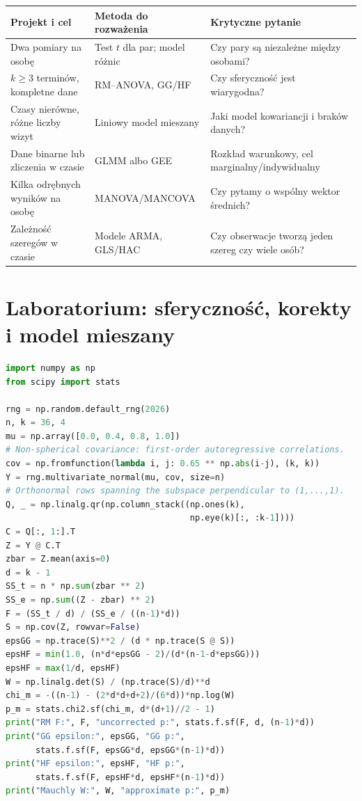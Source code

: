 \begin{center}\small
\begin{tabular}{>{\raggedright\arraybackslash}p{}>{\raggedright\arraybackslash}p{}>{\raggedright\arraybackslash}p{}}
\toprule
\textbf{Projekt i cel} & \textbf{Metoda do rozważenia} & \textbf{Krytyczne pytanie}\\
\midrule
Dwa pomiary na osobę & Test $t$ dla par; model różnic & Czy pary są niezależne między osobami?\\
$k\ge3$ terminów, kompletne dane & RM--ANOVA, GG/HF & Czy sferyczność jest wiarygodna?\\
Czasy nierówne, różne liczby wizyt & Liniowy model mieszany & Jaki model kowariancji i braków danych?\\
Dane binarne lub zliczenia w czasie & GLMM albo GEE & Rozkład warunkowy, cel marginalny/indywidualny\\
Kilka odrębnych wyników na osobę & MANOVA/MANCOVA & Czy pytamy o wspólny wektor średnich?\\
Zależność szeregów w czasie & Modele ARMA, GLS/HAC & Czy obserwacje tworzą jeden szereg czy wiele osób?\\
\bottomrule
\end{tabular}
\end{center}

\section{Laboratorium: sferyczność, korekty i model mieszany}
\begin{lstlisting}[language=Python,caption={Kompletny program: RM--ANOVA, współczynniki GG/HF i przybliżenie testu Mauchly'ego (Python, NumPy, SciPy).}]
import numpy as np
from scipy import stats

rng = np.random.default_rng(2026)
n, k = 36, 4
mu = np.array([0.0, 0.4, 0.8, 1.0])
# Non-spherical covariance: first-order autoregressive correlations.
cov = np.fromfunction(lambda i, j: 0.65 ** np.abs(i-j), (k, k))
Y = rng.multivariate_normal(mu, cov, size=n)
# Orthonormal rows spanning the subspace perpendicular to (1,...,1).
Q, _ = np.linalg.qr(np.column_stack((np.ones(k),
                                     np.eye(k)[:, :k-1])))
C = Q[:, 1:].T
Z = Y @ C.T
zbar = Z.mean(axis=0)
d = k - 1
SS_t = n * np.sum(zbar ** 2)
SS_e = np.sum((Z - zbar) ** 2)
F = (SS_t / d) / (SS_e / ((n-1)*d))
S = np.cov(Z, rowvar=False)
epsGG = np.trace(S)**2 / (d * np.trace(S @ S))
epsHF = min(1.0, (n*d*epsGG - 2)/(d*(n-1-d*epsGG)))
epsHF = max(1/d, epsHF)
W = np.linalg.det(S) / (np.trace(S)/d)**d
chi_m = -((n-1) - (2*d*d+d+2)/(6*d))*np.log(W)
p_m = stats.chi2.sf(chi_m, d*(d+1)//2 - 1)
print("RM F:", F, "uncorrected p:", stats.f.sf(F, d, (n-1)*d))
print("GG epsilon:", epsGG, "GG p:",
      stats.f.sf(F, epsGG*d, epsGG*(n-1)*d))
print("HF epsilon:", epsHF, "HF p:",
      stats.f.sf(F, epsHF*d, epsHF*(n-1)*d))
print("Mauchly W:", W, "approximate p:", p_m)
\end{lstlisting}

